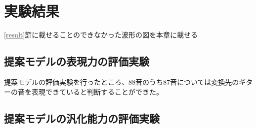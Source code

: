\chapter{実験結果}
\label{sec:appendix_result}

\ref{result}節に載せることのできなかった波形の図を本章に載せる

\section{提案モデルの表現力の評価実験}

提案モデルの評価実験を行ったところ、88音のうち87音については変換先のギターの音を表現できていると判断することができた。


\section{提案モデルの汎化能力の評価実験}